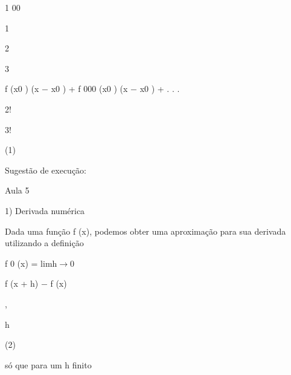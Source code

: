 \documentclass[a4paper,portrait,12pt]{article}
\begin{document}
1 00


1


2


3


\begin{flushleft}
f (x0 ) (x $-$ x0 ) + f 000 (x0 ) (x $-$ x0 ) + . . .
\end{flushleft}


2!


3!





(1)





\begin{flushleft}
Sugest\~{a}o de execu\c{c}\~{a}o:
\end{flushleft}


\begin{flushleft}
Aula 5
\end{flushleft}





\begin{flushleft}
1) Derivada num\'{e}rica
\end{flushleft}


\begin{flushleft}
Dada uma fun\c{c}\~{a}o f (x), podemos obter uma aproxima\c{c}\~{a}o para sua derivada utilizando a defini\c{c}\~{a}o
\end{flushleft}


\begin{flushleft}
f 0 (x) = limh$\rightarrow$0
\end{flushleft}





\begin{flushleft}
f (x + h) $-$ f (x)
\end{flushleft}


,


\begin{flushleft}
h
\end{flushleft}





(2)





\begin{flushleft}
s\'{o} que para um h finito
\end{flushleft}
\end{document}
